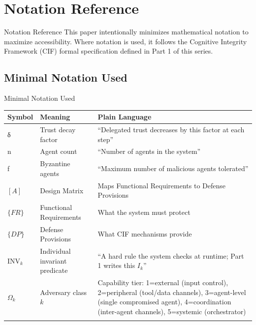 \documentclass[
  ignorenonframetext,
]{beamer}
\author{\texorpdfstring{}{}}
\date{}
\newcounter{none} %
\begin{document}
\begin{frame}
\newpage
\end{frame}

\section{Notation Reference}\label{sec:notation-reference}

\begin{frame}[allowframebreaks]{Notation Reference}
This paper intentionally minimizes mathematical notation to maximize
accessibility. Where notation is used, it follows the Cognitive
Integrity Framework (CIF) formal specification defined in Part 1 of this
series.
\end{frame}

\subsection{Minimal Notation Used}\label{minimal-notation-used}

\begin{frame}[allowframebreaks]{Minimal Notation Used}
{\def\LTcaptype{none} %
\begin{longtable}[]{@{}
  >{\raggedright\arraybackslash}p{}
  >{\raggedright\arraybackslash}p{}
  >{\raggedright\arraybackslash}p{}@{}}
\toprule\noalign{}
\begin{minipage}[b]{\linewidth}\raggedright
Symbol
\end{minipage} & \begin{minipage}[b]{\linewidth}\raggedright
Meaning
\end{minipage} & \begin{minipage}[b]{\linewidth}\raggedright
Plain Language
\end{minipage} \\
\midrule\noalign{}
\endhead
δ & Trust decay factor & ``Delegated trust decreases by this factor at
each step'' \\
n & Agent count & ``Number of agents in the system'' \\
f & Byzantine agents & ``Maximum number of malicious agents
tolerated'' \\
\([A]\) & Design Matrix & Maps Functional Requirements to Defense
Provisions \\
\(\{FR\}\) & Functional Requirements & What the system must protect \\
\(\{DP\}\) & Defense Provisions & What CIF mechanisms provide \\
\(\text{INV}_k\) & Individual invariant predicate & ``A hard rule the
system checks at runtime; Part 1 writes this \(I_k\)'' \\
\(\Omega_k\) & Adversary class \(k\) & Capability tier: 1=external
(input control), 2=peripheral (tool/data channels), 3=agent-level
(single compromised agent), 4=coordination (inter-agent channels),
5=systemic (orchestrator) \\
\bottomrule\noalign{}
\end{longtable}
}
\end{frame}
\end{document}

